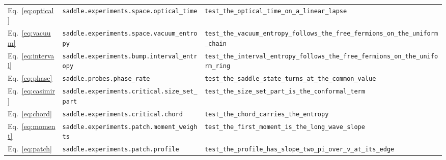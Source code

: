\begin{tabular}{lp{2.55in}p{3.15in}}
Eq.~\eqref{eq:optical} & \raggedright \texttt{saddle.\allowbreak{}experiments.\allowbreak{}space.\allowbreak{}optical\_\allowbreak{}time} & \raggedright \texttt{test\_\allowbreak{}the\_\allowbreak{}optical\_\allowbreak{}time\_\allowbreak{}on\_\allowbreak{}a\_\allowbreak{}linear\_\allowbreak{}lapse} \tabularnewline
Eq.~\eqref{eq:vacuum} & \raggedright \texttt{saddle.\allowbreak{}experiments.\allowbreak{}space.\allowbreak{}vacuum\_\allowbreak{}entropy} & \raggedright \texttt{test\_\allowbreak{}the\_\allowbreak{}vacuum\_\allowbreak{}entropy\_\allowbreak{}follows\_\allowbreak{}the\_\allowbreak{}free\_\allowbreak{}fermions\_\allowbreak{}on\_\allowbreak{}the\_\allowbreak{}uniform\_\allowbreak{}chain} \tabularnewline
Eq.~\eqref{eq:interval} & \raggedright \texttt{saddle.\allowbreak{}experiments.\allowbreak{}bump.\allowbreak{}interval\_\allowbreak{}entropy} & \raggedright \texttt{test\_\allowbreak{}the\_\allowbreak{}interval\_\allowbreak{}entropy\_\allowbreak{}follows\_\allowbreak{}the\_\allowbreak{}free\_\allowbreak{}fermions\_\allowbreak{}on\_\allowbreak{}the\_\allowbreak{}uniform\_\allowbreak{}ring} \tabularnewline
Eq.~\eqref{eq:phase} & \raggedright \texttt{saddle.\allowbreak{}probes.\allowbreak{}phase\_\allowbreak{}rate} & \raggedright \texttt{test\_\allowbreak{}the\_\allowbreak{}saddle\_\allowbreak{}state\_\allowbreak{}turns\_\allowbreak{}at\_\allowbreak{}the\_\allowbreak{}common\_\allowbreak{}value} \tabularnewline
Eq.~\eqref{eq:casimir} & \raggedright \texttt{saddle.\allowbreak{}experiments.\allowbreak{}critical.\allowbreak{}size\_\allowbreak{}set\_\allowbreak{}part} & \raggedright \texttt{test\_\allowbreak{}the\_\allowbreak{}size\_\allowbreak{}set\_\allowbreak{}part\_\allowbreak{}is\_\allowbreak{}the\_\allowbreak{}conformal\_\allowbreak{}term} \tabularnewline
Eq.~\eqref{eq:chord} & \raggedright \texttt{saddle.\allowbreak{}experiments.\allowbreak{}critical.\allowbreak{}chord} & \raggedright \texttt{test\_\allowbreak{}the\_\allowbreak{}chord\_\allowbreak{}carries\_\allowbreak{}the\_\allowbreak{}entropy} \tabularnewline
Eq.~\eqref{eq:moment} & \raggedright \texttt{saddle.\allowbreak{}experiments.\allowbreak{}patch.\allowbreak{}moment\_\allowbreak{}weights} & \raggedright \texttt{test\_\allowbreak{}the\_\allowbreak{}first\_\allowbreak{}moment\_\allowbreak{}is\_\allowbreak{}the\_\allowbreak{}long\_\allowbreak{}wave\_\allowbreak{}slope} \tabularnewline
Eq.~\eqref{eq:patch} & \raggedright \texttt{saddle.\allowbreak{}experiments.\allowbreak{}patch.\allowbreak{}profile} & \raggedright \texttt{test\_\allowbreak{}the\_\allowbreak{}profile\_\allowbreak{}has\_\allowbreak{}slope\_\allowbreak{}two\_\allowbreak{}pi\_\allowbreak{}over\_\allowbreak{}v\_\allowbreak{}at\_\allowbreak{}its\_\allowbreak{}edge} \tabularnewline

\end{tabular}
